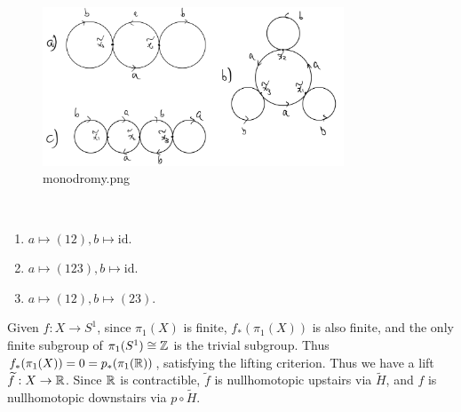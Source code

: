 \documentclass[12pt]{article}
\begin{document}
\begin{problem}[11]
~\begin{figure}[H]
	\centering
	\includegraphics[width=0.8\textwidth]{./figures/monodromy.png}
	\caption{monodromy.png}
\end{figure}
~\begin{enumerate}[label=(\alph*)]
	\item $ a \mapsto (12),b\mapsto \text{id}$.
	\item $ a\mapsto (123), b \mapsto \text{id}$.
	\item $ a\mapsto (12), b \mapsto (23)$.
\end{enumerate}
\end{problem}

\begin{problem}[13]
Given $ f:X \to S^{1}$, since $ \pi_1( X) $ is finite, $ f_*( \pi_1( X) )$ is also finite, and the only finite subgroup of $ \pi_1( S^{1}) \cong \mathbb{Z}$ is the trivial subgroup. Thus $ f_*( \pi_1( X) ) = 0 = p_*( \pi_1( \mathbb{R}) )$, satisfying the lifting criterion. Thus we have a lift $ \widetilde{ f}: X \to \mathbb{R}$. Since $ \mathbb{R}$ is contractible, $ \widetilde{ f}$ is nullhomotopic upstairs via $ \widetilde{ H}$, and $ f$ is nullhomotopic downstairs via  $ p \circ \widetilde{ H}$.
\end{problem}
\end{document}
